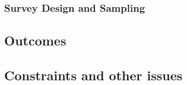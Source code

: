 \documentclass[]{article}
\begin{document}
\hypertarget{survey-design-and-sampling}{%
\subsubsection{Survey Design and
Sampling}\label{survey-design-and-sampling}}

\hypertarget{outcomes}{%
\subsection{Outcomes}\label{outcomes}}

\hypertarget{constraints-and-other-issues-1}{%
\subsection{Constraints and other
issues}\label{constraints-and-other-issues-1}}
\end{document}
